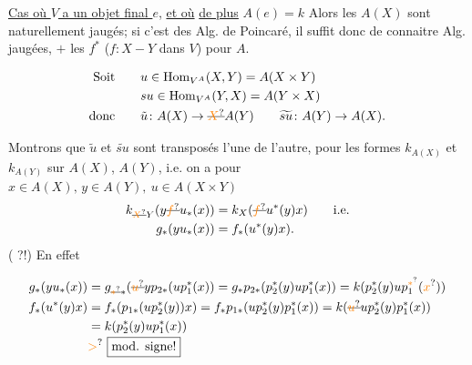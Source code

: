 
\uline{Cas où $V$ a un objet final $e$}, \uline{et où} \uline{de plus} $A(e)=k$  Alors les $A(X)$ sont naturellement jaugés; si c'est des Alg. de Poincaré, il suffit donc de connaitre  Alg. jaugées, $+$ les $f^{*}$ ($f\colon X\mathbin{-}Y$ dans $V$) pour  $A$.

\[
\begin{aligned}
 \text{Soit}\qquad &u\in\operatorname{Hom}_{V^{A}}(X,Y)=A(X\times Y)\\
 &su\in\operatorname{Hom}_{V^{A}}(Y,X)=A(Y\times X)\\
 \text{donc}\qquad &\tilde u\colon A(X)\to\deleted{\unsure{X}}A(Y)
 \qquad \widetilde{su}\colon A(Y)\to A(X).
\end{aligned}
\]

Montrons que  $\tilde u$ et $\widetilde{su}$ sont transposés l'une de l'autre, pour les formes $k_{A(X)}$ et $k_{A(Y)}$ sur $A(X)$, $A(Y)$, i.e. on a pour $x\in A(X),\,y\in A(Y),\ u\in A(X\times Y)$
\[
\begin{aligned}
 k_{\deleted{\unsure{X}}Y}(y\deleted{\unsure{f}}u_{*}(x))&=k_X(\deleted{\unsure{f}}u^{*}(y)x)\qquad \text{i.e.}\\
 g_{*}(yu_{*}(x))&=f_{*}(u^{*}(y)x).
\end{aligned}
\]
( ?!) En effet



\[
\begin{aligned}
 g_*(yu_*(x))&=g_{\deleted{\unsure{*}}*}(\deleted{\unsure{u}}y p_{2*}(u p_1^*(x))=g_*p_{2*}(p_2^*(y)u p_1^*(x))=k(p_2^*(y)u p_1^{\unsure{*}}(\unsure{x}))\\
 f_*(u^*(y)x)&=f_*(p_{1*}(u p_2^*(y))x)=f_*p_{1*}(u p_2^*(y)p_1^*(x))=k(\deleted{\unsure{u}}u p_2^*(y)p_1^*(x))\\
 &=k(p_2^*(y)u p_1^*(x))\\[-2pt]
 &\unsure{>}\ \boxed{\text{mod. signe!}}
\end{aligned}
\]

